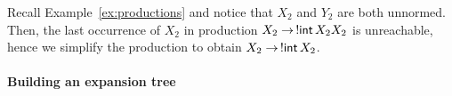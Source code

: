 


\begin{example}
  \label{ex:prune}
  Recall Example~\ref{ex:productions} and notice that $X_2$ and $Y_2$
  are both unnormed. Then, the last occurrence of $X_2$ in production
  $X_2 \rightarrow \,!\mathsf{int}\, X_2 X_2$ is unreachable, hence we
  simplify the production to obtain $X_2 \rightarrow \,!\mathsf{int}\, X_2$.
\end{example}

\paragraph{Building an expansion tree}


